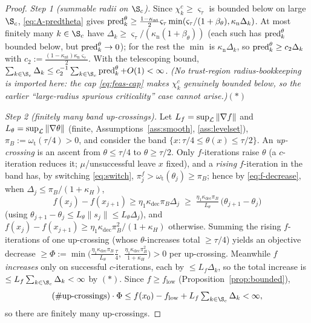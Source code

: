 \begin{proof}
  \emph{Step 1 (summable radii on $\S_c$).} Since $\chi_k^c\ge\varsigma_\tau$ is bounded
  below on large $\S_c$, \eqref{eq:A-predtheta} gives
  $\operatorname{pred}^\theta_k\ge\tfrac{1-\kappa_{\mathrm{nt}}}{2}\varsigma_\tau\min(\varsigma_\tau/(1+\beta_\theta),\kappa_{\mathrm n}\Delta_k)$.
  At most finitely many $k\in\S_c$ have $\Delta_k\ge\varsigma_\tau/(\kappa_{\mathrm n}(1+\beta_\theta))$
  (each such has $\operatorname{pred}^\theta_k$ bounded below, but $\operatorname{pred}^\theta_k\to0$); for the rest
  the $\min$ is $\kappa_{\mathrm n}\Delta_k$, so $\operatorname{pred}^\theta_k\ge c_2\Delta_k$ with
  $c_2:=\tfrac{(1-\kappa_{\mathrm{nt}})\kappa_{\mathrm n}\varsigma_\tau}{2}$. With the
  telescoping bound,
  $\sum_{k\in\S_c}\Delta_k\le c_2^{-1}\sum_{k\in\S_c}\pred^\theta_k+O(1)<\infty$.
  \emph{(No trust-region radius-bookkeeping is imported here: the cap
  \eqref{eq:feas-cap} makes $\chi_k^c$ genuinely bounded below, so the earlier
  ``large-radius spurious criticality'' case cannot arise.)}\hfill$(\ast)$

  \emph{Step 2 (finitely many band up-crossings).} Let $L_f=\sup_{\mathcal{L}}\|\nabla f\|$
  and $L_\theta=\sup_{\mathcal{L}}\|\nabla\theta\|$ (finite, Assumptions~\ref{ass:smooth},
  \ref{ass:levelset}), $\pi_B:=\omega_{\mathrm t}(\tau/4)>0$, and consider the band
  $\{x:\tau/4\le\theta(x)\le\tau/2\}$. An \emph{up-crossing} is an ascent from
  $\theta\le\tau/4$ to $\theta\ge\tau/2$. Only $f$-iterations raise $\theta$ (a
  $c$-iteration reduces it; $\mu$/unsuccessful leave $x$ fixed), and a \emph{rising}
  $f$-iteration in the band has, by switching \eqref{eq:switch},
  $\pi_j^f>\omega_{\mathrm t}(\theta_j)\ge\pi_B$; hence by \eqref{eq:f-decrease}, when
  $\Delta_j\le\pi_B/(1+\kappa_H)$,
  \[
    f(x_j)-f(x_{j+1})\ge\eta_1\kappa_{\mathrm{dec}}\pi_B\Delta_j
      \;\ge\;\tfrac{\eta_1\kappa_{\mathrm{dec}}\pi_B}{L_\theta}\,\bigl(\theta_{j+1}-\theta_j\bigr)
  \]
  (using $\theta_{j+1}-\theta_j\le L_\theta\|s_j\|\le L_\theta\Delta_j$), and
  $f(x_j)-f(x_{j+1})\ge\eta_1\kappa_{\mathrm{dec}}\pi_B^2/(1+\kappa_H)$ otherwise.
  Summing the rising $f$-iterations of one up-crossing (whose $\theta$-increases total
  $\ge\tau/4$) yields an objective decrease $\ge
  \Phi:=\min\!\bigl(\tfrac{\eta_1\kappa_{\mathrm{dec}}\pi_B}{L_\theta}\tfrac{\tau}{4},\ \tfrac{\eta_1\kappa_{\mathrm{dec}}\pi_B^2}{1+\kappa_H}\bigr)>0$
  per up-crossing. Meanwhile $f$ \emph{increases} only on successful $c$-iterations,
  each by $\le L_f\Delta_k$, so the total increase is $\le L_f\sum_{k\in\S_c}\Delta_k<\infty$
  by $(\ast)$. Since $f\ge f_{\mathrm{low}}$ (Proposition~\ref{prop:bounded}),
  \[
    (\#\text{up-crossings})\cdot\Phi \le f(x_0)-f_{\mathrm{low}}+L_f\textstyle\sum_{k\in\S_c}\Delta_k <\infty,
  \]
  so there are finitely many up-crossings.


\end{proof}
